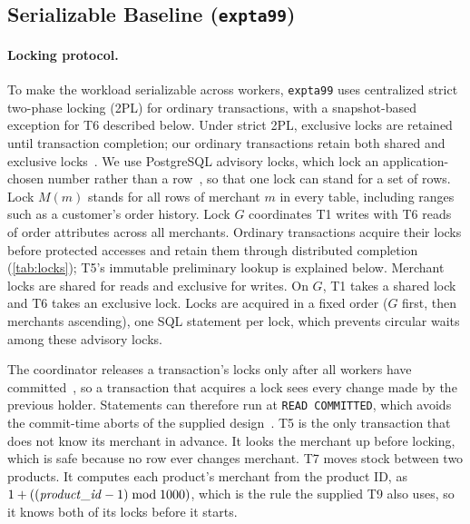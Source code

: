 \documentclass[sigconf,10pt,nonacm]{acmart}
\newcommand{\expt}[1]{\texttt{expt\textunderscore #1}}
\renewcommand{\_}{\underscorewithoutbreak\allowbreak}
\begin{document}
\subsection{Serializable Baseline (\expt{a99})}
\label{sec:a99}

\paragraph{Locking protocol.} To make the workload serializable across workers,
\expt{a99} uses centralized strict two-phase locking (2PL) for ordinary transactions,
with a snapshot-based exception for T6 described below. Under strict 2PL, exclusive
locks are retained until transaction completion; our ordinary transactions retain
both shared and exclusive locks~\cite{ozsu2020}. We use PostgreSQL advisory locks,
which lock an application-chosen number rather than a row~\cite{pgadvisory}, so that
one lock can stand for a set of rows. Lock $M(m)$ stands for all rows of merchant
$m$ in every table, including ranges such as a customer's order history. Lock $G$
coordinates T1 writes with T6 reads of order attributes across all merchants.
Ordinary transactions acquire their locks before protected accesses and retain them
through distributed completion (\cref{tab:locks}); T5's immutable preliminary lookup
is explained below. Merchant locks are shared for reads and exclusive for writes.
On $G$, T1 takes a shared lock and T6 takes an exclusive lock. Locks are acquired
in a fixed order ($G$ first, then merchants ascending), one SQL statement per lock,
which prevents circular waits among these advisory locks.

The coordinator releases a transaction's locks only after all workers have
committed~\cite{citustx}, so a transaction that acquires a lock sees every change made
by the previous holder. Statements can therefore run at \texttt{READ COMMITTED}, which
avoids the commit-time aborts of the supplied design~\cite{pgisolation}. T5 is the only
transaction that does not know its merchant in advance. It looks the merchant up before
locking, which is safe because no row ever changes merchant. T7 moves stock between two
products. It computes each product's merchant from the product ID, as
$1 + ((\mathit{product\_id} - 1) \bmod 1000)$, which is the rule the supplied T9 also
uses, so it knows both of its locks before it starts.
\end{document}

